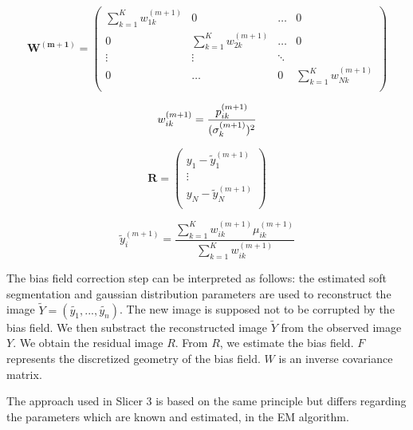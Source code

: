 \begin{itemize}
\begin{itemize}
  \begin{equation*}
   \mathbf{W^{(m+1)}} = \left(
  \begin{array}{clcr}
   \sum_{k=1}^K w_{1k}^{(m+1)} & 0 & \ldots & 0 \\
   0 & \sum_{k=1}^K w_{2k}^{(m+1)} & \ldots & 0 \\
   \vdots & \vdots & \ddots \\
   0 &  \ldots & 0 & \sum_{k=1}^K w_{Nk}^{(m+1)} \\
  \end{array} \right)
  \end{equation*}

  \begin{equation*}
  w_{ik}^{(m+1)}  = \frac{p_{ik}^{(m+1)}}{(\sigma_k^{(m+1)})^2}\\
  \end{equation*}
  
  \begin{equation*}
   \mathbf{R} = \left(
  \begin{array}{cl}
   y_1 - \tilde{y}_1^{(m+1)} \\
   \vdots\\
   y_N - \tilde{y}_N^{(m+1)} \\
  \end{array} \right)
  \end{equation*}
  
  \begin{equation*}
  \tilde{y}_i^{(m+1)}  = \frac{\sum_{k=1}^K w_{ik}^{(m+1)} \mu_{ik}^{(m+1)}}{\sum_{k=1}^K w_{ik}^{(m+1)}}
  \end{equation*}


  \end{itemize}

\end{itemize}

The bias field correction step can be interpreted as follows: the estimated soft segmentation and gaussian distribution parameters are used to reconstruct the image $\tilde{Y}=(\tilde{y_1}, ..., \tilde{y_n})$. The new image is supposed not to be corrupted by the bias field. We then substract the reconstructed image $\tilde{Y}$ from the observed image $Y$. We obtain the residual image $R$. From $R$, we estimate the bias field. $F$ represents the discretized geometry of the bias field. $W$ is an inverse covariance matrix.
\par
The approach used in Slicer 3 is based on the same principle but differs regarding the parameters which are known and estimated, in the EM algorithm. 
%

